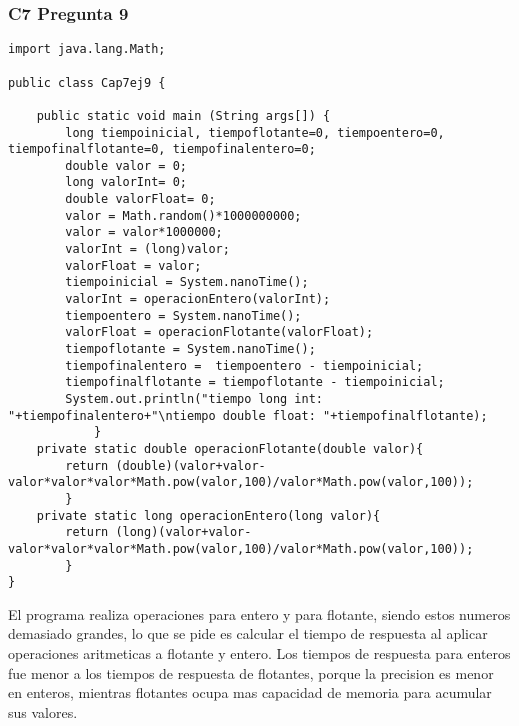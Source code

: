 \subsubsection{C7 Pregunta 9}
\begin{lstlisting}
import java.lang.Math;

public class Cap7ej9 {
	
	public static void main (String args[]) {
		long tiempoinicial, tiempoflotante=0, tiempoentero=0, tiempofinalflotante=0, tiempofinalentero=0;
		double valor = 0;
		long valorInt= 0;
		double valorFloat= 0;
		valor = Math.random()*1000000000;
		valor = valor*1000000;
		valorInt = (long)valor;
		valorFloat = valor;
		tiempoinicial = System.nanoTime();
		valorInt = operacionEntero(valorInt);
		tiempoentero = System.nanoTime();
		valorFloat = operacionFlotante(valorFloat);
		tiempoflotante = System.nanoTime();
		tiempofinalentero =  tiempoentero - tiempoinicial;
		tiempofinalflotante = tiempoflotante - tiempoinicial;
		System.out.println("tiempo long int: "+tiempofinalentero+"\ntiempo double float: "+tiempofinalflotante);
			}
	private static double operacionFlotante(double valor){
		return (double)(valor+valor-valor*valor*valor*Math.pow(valor,100)/valor*Math.pow(valor,100));
		}
	private static long operacionEntero(long valor){
		return (long)(valor+valor-valor*valor*valor*Math.pow(valor,100)/valor*Math.pow(valor,100));
		}
}
 \end{lstlisting}

El programa realiza operaciones para entero y para flotante, siendo estos numeros demasiado grandes, lo que se pide es calcular el tiempo de respuesta al aplicar operaciones aritmeticas a flotante y entero. Los tiempos de respuesta para enteros fue menor a los tiempos de respuesta de flotantes, porque la precision es menor en enteros, mientras flotantes ocupa mas capacidad de memoria para acumular sus valores.
